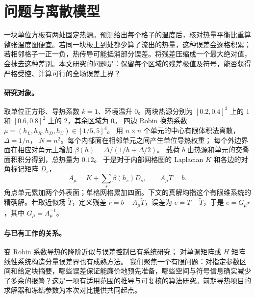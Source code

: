 \section{问题与离散模型}
一块单位方板有两处固定热源。预测给出每个格子的温度后，核对热量平衡比重算整张温度图便宜。若同一块板上到处都少算了流出的热量，这种误差会逐格积累；若相邻格子一正一负，热传导可能抵消部分误差。将残差压缩成一个最大绝对值，会抹去这种差别。本文研究的问题是：保留每个区域的残差极值及符号，能否获得严格受控、计算可行的全场误差上界？

\paragraph{研究对象。}
取单位正方形、导热系数 $k=1$、环境温升 $0$。两块热源分别为
$[0.2,0.4]^2$ 上的 $1$ 和 $[0.6,0.8]^2$ 上的 $2$，其余区域为 $0$。
四边 Robin 换热系数 $\mu=(h_L,h_R,h_D,h_U)\in[1/5,5]^4$。
用 $n\times n$ 个单元的中心有限体积法离散，$\Delta=1/n$，
$N=n^2$。每个内部面在相邻单元之间产生单位导热权重；
每个外边界面在相应对角元上增加 $\beta(h)=\Delta/(1/h+\Delta/2)$。
载荷 $b$ 由热源和单元的交叠面积积分得到，总热量为 $0.12$。
于是对于内部网格图的 Laplacian $K$ 和各边的对角标记矩阵 $D_s$，
\[
 A_\mu=K+\sum_s\beta(h_s)D_s,\qquad A_\mu T=b.
\]
角点单元累加两个外表面；单格网格累加四面。下文的真解均指这个有限维系统的精确解。若取近似场 $\widetilde T$，定义残差 $r=b-A_\mu\widetilde T$，误差为 $e=T-\widetilde T$，于是 $e=G_\mu r$，其中 $G_\mu=A_\mu^{-1}$。

\paragraph{与已有工作的关系。}
变 Robin 系数导热的降阶近似与误差控制已有系统研究\cite{boyaval2009}；
对单调矩阵或 $H$ 矩阵线性系统构造分量误差界也有成熟方法\cite{minamihata2013,minamihata2015}。
我们聚焦一个有限问题：对指定参数区间和给定块摘要，哪些误差保证能廉价地预先准备，哪些空间与符号信息确实减少了多余的报警？这是一项有适用范围的推导与可复核的算法研究。前期导热项目的求解器和冻结参数为本次对比提供共同起点。
